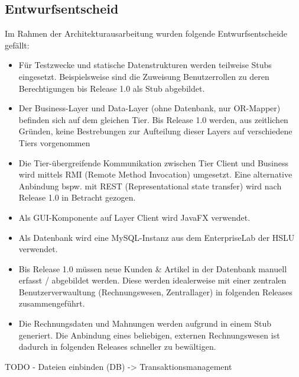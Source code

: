 \subsection{Entwurfsentscheid}
Im Rahmen der Architekturausarbeitung wurden folgende Entwurfsentscheide gefällt:
\begin{itemize}
	\item Für Testzwecke und statische Datenstrukturen werden teilweise Stubs eingesetzt. Beispielsweise sind die Zuweisung Benutzerrollen zu deren Berechtigungen bis Release 1.0 als Stub abgebildet.
	\item Der Business-Layer und Data-Layer (ohne Datenbank, nur OR-Mapper) befinden sich auf dem gleichen Tier. Bis Release 1.0 werden, aus zeitlichen Gründen, keine Bestrebungen zur Aufteilung dieser Layers auf verschiedene Tiers vorgenommen
	\item Die Tier-übergreifende Kommunikation zwischen Tier Client und Business wird mittels RMI (Remote Method Invocation) umgesetzt. Eine alternative Anbindung bspw. mit REST (Representational state transfer) wird nach Release 1.0 in Betracht gezogen.
	\item Als GUI-Komponente auf Layer Client wird JavaFX verwendet.
	\item Als Datenbank wird eine MySQL-Instanz aus dem EnterpriseLab der HSLU verwendet.
	\item Bis Release 1.0 müssen neue Kunden \& Artikel in der Datenbank manuell erfasst / abgebildet werden. Diese werden idealerweise mit einer zentralen Benutzerverwaultung (Rechnungswesen, Zentrallager) in folgenden Releases zusammengeführt.
	\item Die Rechnungsdaten und Mahnungen werden aufgrund in einem Stub generiert. Die Anbindung eines beliebigen, externen Rechnungswesen ist dadurch in folgenden Releases schneller zu bewältigen.
\end{itemize}

TODO
- Dateien einbinden (DB) -> Transaktionsmanagement


